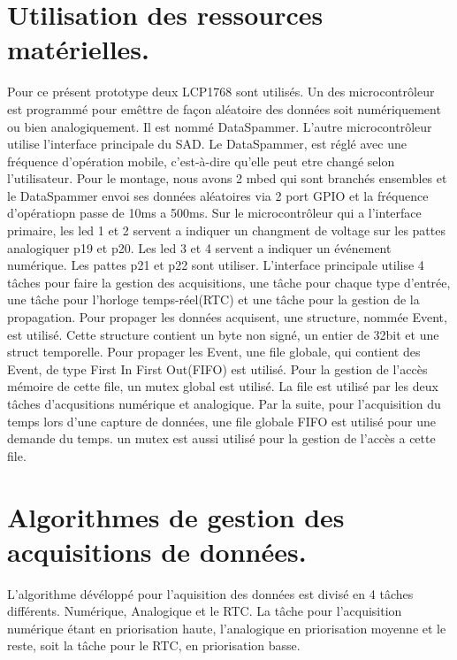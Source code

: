 \documentclass[12pt]{article}
\begin{document}
\section{Utilisation des ressources matérielles.}
Pour ce présent prototype deux LCP1768 sont utilisés. Un des microcontrôleur est programmé pour emêttre de façon aléatoire des données soit numériquement ou bien analogiquement. Il est nommé DataSpammer. L'autre microcontrôleur utilise l'interface principale du SAD. Le DataSpammer, est réglé avec une fréquence d'opération mobile, c'est-à-dire qu'elle peut etre changé selon l'utilisateur. Pour le montage, nous avons 2 mbed qui sont branchés ensembles et le DataSpammer envoi ses données aléatoires via 2 port GPIO et la fréquence d'opératiopn passe de 10ms a 500ms. Sur le microcontrôleur qui a l'interface primaire, les led 1 et 2 servent a indiquer un changment de voltage sur les pattes analogiquer p19 et p20. Les led 3 et 4 servent a indiquer un événement numérique. Les pattes p21 et p22 sont utiliser.
\newpage
L'interface principale utilise 4 tâches pour faire la gestion des acquisitions, une tâche pour chaque type d'entrée, une tâche pour l'horloge temps-réel(RTC) et une tâche pour la gestion de la propagation. Pour propager les données acquisent, une structure, nommée Event, est utilisé. Cette structure contient un byte non signé, un entier de 32bit et une struct temporelle. Pour propager les Event, une file globale, qui contient des Event, de type First In First Out(FIFO) est utilisé. Pour la gestion de l'accès mémoire de cette file, un mutex global est utilisé. La file est utilisé par les deux tâches d'acqusitions numérique et analogique. Par la suite, pour l'acquisition du temps lors d'une capture de données, une file globale FIFO est utilisé pour une demande du temps. un mutex est aussi utilisé pour la gestion de l'accès a cette file. 

\section{Algorithmes de gestion des acquisitions de données.}
L'algorithme dévéloppé pour l'aquisition des données est divisé en 4 tâches différents. Numérique, Analogique et le RTC. La tâche pour l'acquisition numérique étant en priorisation haute, l'analogique en priorisation moyenne et le reste, soit la tâche pour le RTC, en priorisation basse.
\end{document}
